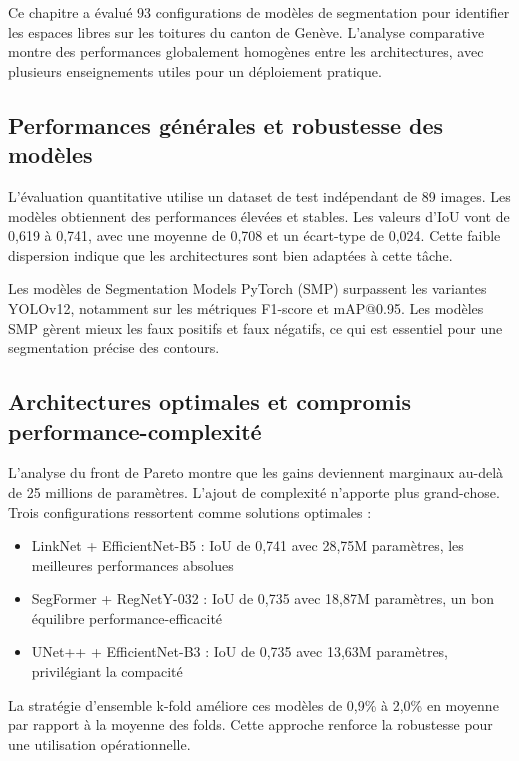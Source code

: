 Ce chapitre a évalué 93 configurations de modèles de segmentation pour identifier les espaces libres sur les toitures du canton de Genève. L'analyse comparative montre des performances globalement homogènes entre les architectures, avec plusieurs enseignements utiles pour un déploiement pratique.

\subsection{Performances générales et robustesse des modèles}

L'évaluation quantitative utilise un dataset de test indépendant de 89 images. Les modèles obtiennent des performances élevées et stables. Les valeurs d'IoU vont de 0,619 à 0,741, avec une moyenne de 0,708 et un écart-type de 0,024. Cette faible dispersion indique que les architectures sont bien adaptées à cette tâche.

Les modèles de Segmentation Models PyTorch (SMP) surpassent les variantes YOLOv12, notamment sur les métriques F1-score et mAP@0.95. Les modèles SMP gèrent mieux les faux positifs et faux négatifs, ce qui est essentiel pour une segmentation précise des contours.

\subsection{Architectures optimales et compromis performance-complexité}

L'analyse du front de Pareto montre que les gains deviennent marginaux au-delà de 25 millions de paramètres. L'ajout de complexité n'apporte plus grand-chose. Trois configurations ressortent comme solutions optimales :

\begin{itemize}
    \item LinkNet + EfficientNet-B5 : IoU de 0,741 avec 28,75M paramètres, les meilleures performances absolues
    \item SegFormer + RegNetY-032 : IoU de 0,735 avec 18,87M paramètres, un bon équilibre performance-efficacité
    \item UNet++ + EfficientNet-B3 : IoU de 0,735 avec 13,63M paramètres, privilégiant la compacité
\end{itemize}

La stratégie d'ensemble k-fold améliore ces modèles de 0,9\% à 2,0\% en moyenne par rapport à la moyenne des folds. Cette approche renforce la robustesse pour une utilisation opérationnelle.


